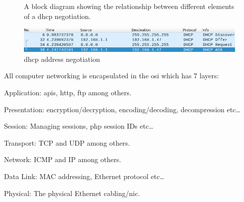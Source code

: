 \documentclass[titlepage]{article}
\begin{document}
\begin{figure}[H]

  \begin{framed}

  \centering

  \end{framed}

  \caption{%
    A block diagram showing the relationship between
    different elements of a \gls{dhcp} negotiation.
  }\label{dhcpdiagram}
\end{figure}

\begin{figure}[H]
  \centering
  \includegraphics[width=\textwidth]{dhcp_negotiation.png}
  \caption{\gls{dhcp} address negotiation}\label{dhcp_negotiate}
\end{figure}

All computer networking is encapsulated in the \gls{osi} which has 7 layers:

\begin{etaremune}
  \item{Application: \gls{api}s, \gls{http}, \gls{ftp} among others.}
  \item{Presentation: encryption/decryption, encoding/decoding, decompression etc\ldots}
  \item{Session: Managing sessions, \gls{php} session IDs etc\ldots}
  \item{Transport: TCP and UDP among others.}
  \item{Network: ICMP and IP among others.}
  \item{Data Link: MAC addressing, Ethernet protocol etc\ldots}
  \item{Physical: The physical Ethernet cabling/\gls{nic}.}
\end{etaremune}
\end{document}
